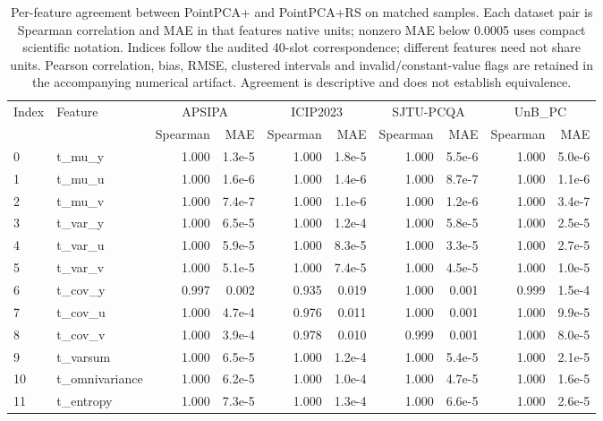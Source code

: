 \begin{table}[t!]
\centering
\caption{Per-feature agreement between PointPCA+ and PointPCA+RS on matched samples. Each dataset pair is Spearman correlation and MAE in that feature\textquotesingle s native units; nonzero MAE below 0.0005 uses compact scientific notation. Indices follow the audited 40-slot correspondence; different features need not share units. Pearson correlation, bias, RMSE, clustered intervals and invalid/constant-value flags are retained in the accompanying numerical artifact. Agreement is descriptive and does not establish equivalence.}
\label{tab_review_feature_agreement}
\scriptsize
\begin{adjustbox}{max width=\textwidth}
\begin{tabular}{llrrrrrrrr}
\toprule
Index & Feature & \multicolumn{2}{c}{APSIPA} & \multicolumn{2}{c}{ICIP2023} & \multicolumn{2}{c}{SJTU-PCQA} & \multicolumn{2}{c}{UnB\_PC} \\
 & & Spearman & MAE & Spearman & MAE & Spearman & MAE & Spearman & MAE \\
\midrule
0 & t\_mu\_y & 1.000 & 1.3e-5 & 1.000 & 1.8e-5 & 1.000 & 5.5e-6 & 1.000 & 5.0e-6 \\
1 & t\_mu\_u & 1.000 & 1.6e-6 & 1.000 & 1.4e-6 & 1.000 & 8.7e-7 & 1.000 & 1.1e-6 \\
2 & t\_mu\_v & 1.000 & 7.4e-7 & 1.000 & 1.1e-6 & 1.000 & 1.2e-6 & 1.000 & 3.4e-7 \\
3 & t\_var\_y & 1.000 & 6.5e-5 & 1.000 & 1.2e-4 & 1.000 & 5.8e-5 & 1.000 & 2.5e-5 \\
4 & t\_var\_u & 1.000 & 5.9e-5 & 1.000 & 8.3e-5 & 1.000 & 3.3e-5 & 1.000 & 2.7e-5 \\
5 & t\_var\_v & 1.000 & 5.1e-5 & 1.000 & 7.4e-5 & 1.000 & 4.5e-5 & 1.000 & 1.0e-5 \\
6 & t\_cov\_y & 0.997 & 0.002 & 0.935 & 0.019 & 1.000 & 0.001 & 0.999 & 1.5e-4 \\
7 & t\_cov\_u & 1.000 & 4.7e-4 & 0.976 & 0.011 & 1.000 & 0.001 & 1.000 & 9.9e-5 \\
8 & t\_cov\_v & 1.000 & 3.9e-4 & 0.978 & 0.010 & 0.999 & 0.001 & 1.000 & 8.0e-5 \\
9 & t\_varsum & 1.000 & 6.5e-5 & 1.000 & 1.2e-4 & 1.000 & 5.4e-5 & 1.000 & 2.1e-5 \\
10 & t\_omnivariance & 1.000 & 6.2e-5 & 1.000 & 1.0e-4 & 1.000 & 4.7e-5 & 1.000 & 1.6e-5 \\
11 & t\_entropy & 1.000 & 7.3e-5 & 1.000 & 1.3e-4 & 1.000 & 6.6e-5 & 1.000 & 2.6e-5 \\

\end{tabular}
\end{adjustbox}
\end{table}
